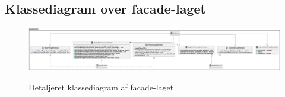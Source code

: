 \begin{landscape}
    \section{Klassediagram over facade-laget}\label{apdx:classDiagram_facade_full}
    \begin{figure}[H]
        \centering
        \caption{Detaljeret klassediagram af facade-laget}
        \includegraphics[width = \linewidth]{TaskFusion/out/assets/diagrams/class_facade_layer_full/ClassDiagram_facade_full.png}
        \label{fig:class_facade_full}
    \end{figure}
\end{landscape}